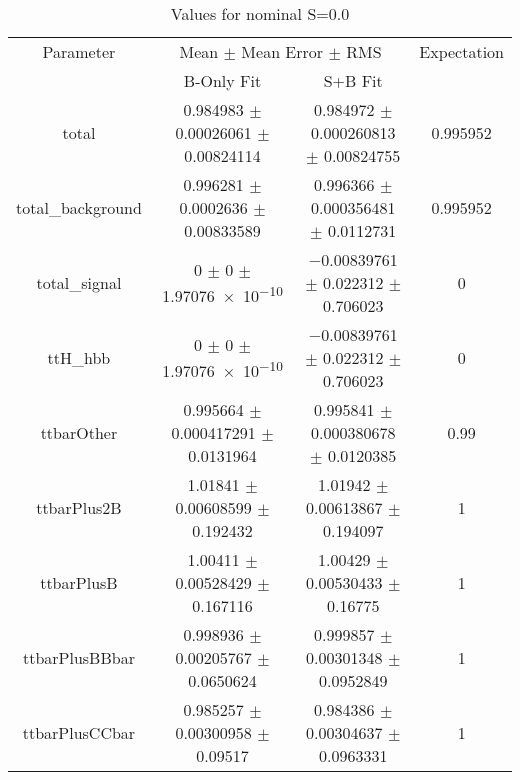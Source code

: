 \begin{table}
\centering
\caption{Values for nominal S=0.0}
\begin{tabular}{cccc}
\toprule
Parameter & \multicolumn{2}{c}{Mean $\pm$ Mean Error $\pm$ RMS} & Expectation\\
 & B-Only Fit & S+B Fit & \\
\midrule
total & \num{0.984983} $\pm$ \num{0.00026061} $\pm$ \num{0.00824114} & \num{0.984972} $\pm$ \num{0.000260813} $\pm$ \num{0.00824755} & \num{0.995952}\\
total\_background & \num{0.996281} $\pm$ \num{0.0002636} $\pm$ \num{0.00833589} & \num{0.996366} $\pm$ \num{0.000356481} $\pm$ \num{0.0112731} & \num{0.995952}\\
total\_signal & \num{0} $\pm$ \num{0} $\pm$ \num{1.97076e-10} & \num{-0.00839761} $\pm$ \num{0.022312} $\pm$ \num{0.706023} & \num{0}\\
ttH\_hbb & \num{0} $\pm$ \num{0} $\pm$ \num{1.97076e-10} & \num{-0.00839761} $\pm$ \num{0.022312} $\pm$ \num{0.706023} & \num{0}\\
ttbarOther & \num{0.995664} $\pm$ \num{0.000417291} $\pm$ \num{0.0131964} & \num{0.995841} $\pm$ \num{0.000380678} $\pm$ \num{0.0120385} & \num{0.99}\\
ttbarPlus2B & \num{1.01841} $\pm$ \num{0.00608599} $\pm$ \num{0.192432} & \num{1.01942} $\pm$ \num{0.00613867} $\pm$ \num{0.194097} & \num{1}\\
ttbarPlusB & \num{1.00411} $\pm$ \num{0.00528429} $\pm$ \num{0.167116} & \num{1.00429} $\pm$ \num{0.00530433} $\pm$ \num{0.16775} & \num{1}\\
ttbarPlusBBbar & \num{0.998936} $\pm$ \num{0.00205767} $\pm$ \num{0.0650624} & \num{0.999857} $\pm$ \num{0.00301348} $\pm$ \num{0.0952849} & \num{1}\\
ttbarPlusCCbar & \num{0.985257} $\pm$ \num{0.00300958} $\pm$ \num{0.09517} & \num{0.984386} $\pm$ \num{0.00304637} $\pm$ \num{0.0963331} & \num{1}\\
\bottomrule
\end{tabular}
\end{table}